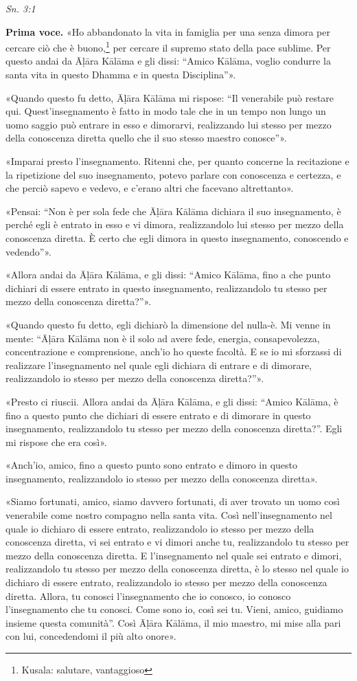 \emph{Sn. 3:1}


\textbf{Prima voce.} «Ho abbandonato la vita in famiglia per una senza dimora per
cercare ciò che è buono,\footnote{Kusala: salutare, vantaggioso} per cercare
il supremo stato della pace sublime. Per questo andai da Āḷāra Kālāma e gli dissi: “Amico
Kālāma, voglio condurre la santa vita in questo Dhamma e in questa
Disciplina”».


«Quando questo fu detto, Āḷāra Kālāma mi rispose: “Il venerabile può
restare qui. Quest’insegnamento è fatto in modo tale che in un tempo non
lungo un uomo saggio può entrare in esso e dimorarvi, realizzando lui
stesso per mezzo della conoscenza diretta quello che il suo stesso
maestro conosce”».


«Imparai presto l’insegnamento. Ritenni che, per quanto concerne la
recitazione e la ripetizione del suo insegnamento, potevo parlare con
conoscenza e certezza, e che perciò sapevo e vedevo, e c’erano altri che
facevano altrettanto».


«Pensai: “Non è per sola fede che Āḷāra Kālāma dichiara il suo
insegnamento, è perché egli è entrato in esso e vi dimora, realizzandolo
lui stesso per mezzo della conoscenza diretta. È certo che egli dimora
in questo insegnamento, conoscendo e vedendo”».


«Allora andai da Āḷāra Kālāma, e gli dissi: “Amico Kālāma, fino a che
punto dichiari di essere entrato in questo insegnamento, realizzandolo
tu stesso per mezzo della conoscenza diretta?”».


«Quando questo fu detto, egli dichiarò la dimensione del nulla-è. Mi
venne in mente: “Āḷāra Kālāma non è il solo ad avere fede, energia,
consapevolezza, concentrazione e comprensione, anch’io ho queste
facoltà. E se io mi sforzassi di realizzare l’insegnamento nel quale
egli dichiara di entrare e di dimorare, realizzandolo io stesso per
mezzo della conoscenza diretta?”».


«Presto ci riuscii. Allora andai da Āḷāra Kālāma, e gli dissi: “Amico
Kālāma, è fino a questo punto che dichiari di essere entrato e di
dimorare in questo insegnamento, realizzandolo tu stesso per mezzo della
conoscenza diretta?”. Egli mi rispose che era così».


«Anch’io, amico, fino a questo punto sono entrato e dimoro in questo
insegnamento, realizzandolo io stesso per mezzo della conoscenza
diretta».


«Siamo fortunati, amico, siamo davvero fortunati, di aver trovato un
uomo così venerabile come nostro compagno nella santa vita. Così
nell’insegnamento nel quale io dichiaro di essere entrato, realizzandolo
io stesso per mezzo della conoscenza diretta, vi sei entrato e vi dimori
anche tu, realizzandolo tu stesso per mezzo della conoscenza diretta. E
l’insegnamento nel quale sei entrato e dimori, realizzandolo tu stesso
per mezzo della conoscenza diretta, è lo stesso nel quale io dichiaro di
essere entrato, realizzandolo io stesso per mezzo della conoscenza
diretta. Allora, tu conosci l’insegnamento che io conosco, io conosco
l’insegnamento che tu conosci. Come sono io, così sei tu. Vieni, amico,
guidiamo insieme questa comunità”. Così Āḷāra Kālāma, il mio maestro, mi
mise alla pari con lui, concedendomi il più alto onore».


